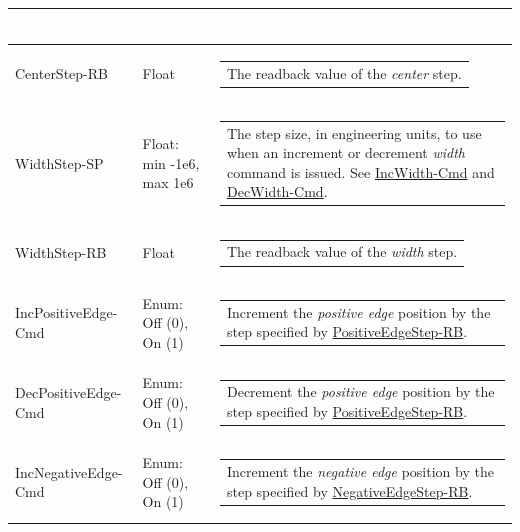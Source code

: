 \documentclass[openany]{article}
\begin{document}
\begin{longtable}{| m{4.5cm} m{2.5cm}  m{7.0cm} |}
\begin{tabular}{@{}m{6cm}@{}}
            \end{tabular} \hypertarget{}{}\\ \hline
        CenterStep-RB & Float & \begin{tabular}{@{}m{6cm}@{}}
                The readback value of the \emph{center} step.
            \end{tabular} \hypertarget{pv:width-step}{}\\ \hline
        WidthStep-SP & Float: min -1e6, max 1e6 & \begin{tabular}{@{}m{6cm}@{}}
                The step size, in engineering units, to use when an increment or decrement \emph{width} command is issued. See \hyperlink{pv:inc-width-cmd}{IncWidth-Cmd} and \hyperlink{pv:dec-width-cmd}{DecWidth-Cmd}.
            \end{tabular} \hypertarget{}{}\\ \hline
        WidthStep-RB & Float & \begin{tabular}{@{}m{6cm}@{}}
                The readback value of the \emph{width} step.
            \end{tabular} \hypertarget{pv:inc-positive-edge-cmd}{}\\ \hline
        IncPositiveEdge-Cmd & Enum: Off (0), On (1) & \begin{tabular}{@{}m{6cm}@{}}
                Increment the \emph{positive edge} position by the step specified by \hyperlink{pv:positive-edge-step}{PositiveEdgeStep-RB}.
            \end{tabular} \hypertarget{pv:dec-positive-edge-cmd}{}\\ \hline
        DecPositiveEdge-Cmd & Enum: Off (0), On (1) & \begin{tabular}{@{}m{6cm}@{}}
                Decrement the \emph{positive edge} position by the step specified by \hyperlink{pv:positive-edge-step}{PositiveEdgeStep-RB}.
            \end{tabular} \hypertarget{pv:inc-negative-edge-cmd}{}\\ \hline
        IncNegativeEdge-Cmd & Enum: Off (0), On (1) & \begin{tabular}{@{}m{6cm}@{}}
                Increment the \emph{negative edge} position by the step specified by \hyperlink{pv:negative-edge-step}{NegativeEdgeStep-RB}.
            \end{tabular} \hypertarget{pv:dec-negative-edge-cmd}{}\\ \hline

\end{longtable}
\end{document}

